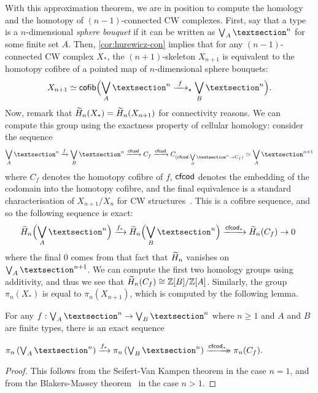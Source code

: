 \documentclass[a4page]{article}
\begin{document}
With this approximation theorem, we are in position to compute the homology and the homotopy
of \( (n - 1) \)-connected CW complexes.
%
First, say that a type is a \( n \)-dimensional \emph{sphere bouquet} if it can be
written as \( \bouquetGen{A}{n} \) for some finite set \( A \).
%
Then, \cref{cor:hurewicz-con} implies that for any \( (n - 1) \)-connected CW complex \( X_\ast \), the
\( (n+1) \)-skeleton \( X_{n+1} \) is equivalent to the homotopy cofibre of a pointed map of
\( n \)-dimensional sphere bouquets:
%
\[
X_{n+1} \simeq \mathsf{cofib}\Big( \bouquetGen{A}{n} \xrightarrow{\ f\ }_\star \bouquetGen{B}{n} \Big).
\]
%
Now, remark that \( \textnormal{\ensuremath{\widetilde{H}_{n}}}(X_\ast) = \textnormal{\ensuremath{\widetilde{H}_{n}}}(X_{n+1})\) for connectivity reasons.
%
We can compute this group using the exactness property of cellular homology:
consider the sequence
%
\[
\bouquetGenL{A}{n} \xrightarrow{f} \bouquetGenL{B}{n} \xrightarrow{\cfcod} C_f
\xrightarrow{\cfcod} C_{(\cfcod : \bouquetGenL{B}{n} \to C_f)} \simeq \bouquetGenL{A}{n+1}
\]
%
where \( C_f \) denotes the homotopy cofibre of \( f \), \( \textnormal{\ensuremath{\textsf{cfcod}}} \) denotes the embedding
of the codomain into the homotopy cofibre, and the final equivalence is a standard characterisation
of $X_{n+1}/X_{n}$ for CW structures~\cite{BuchholtzFavonia18}.
%
This is a cofibre sequence, and so the following sequence is exact:
%
\[
\!\!\hredstr{n}\Big(\bouquetGen{A}{n}\Big) \xrightarrow{f_*} \hredstr{n}\Big(\bouquetGen{B}{n}\Big) \xrightarrow{\cfcod_*} \hredstr{n}{(C_f)} \to 0
\]
%
where the final $0$ comes from that fact that $\textnormal{\ensuremath{\widetilde{H}_{n}}}$ vanishes on $\bouquetGen{A}{n+1}$.
We can compute the first two homology groups using additivity, and thus we see that
$\textnormal{\ensuremath{\widetilde{H}_{n}}}(C_f) \cong \mathbb{Z}[B]/\mathbb{Z}[A]$.
%
Similarly, the group $\pi_n(X_\ast)$ is equal to \( \pi_n(X_{n+1}) \), which is computed
by the following lemma.

\begin{proposition}\label{prop:hurewicz-seq}
  For any $f : \bouquetGen{A}{n} \to \bouquetGen{B}{n}$ where $n\geq 1$ and $A$ and $B$ are finite
  types, there is an exact sequence
  \begin{center}
    \( \pi_n\left(\bouquetGen{A}{n}\right) \xrightarrow{f_*} \pi_n\left(\bouquetGen{B}{n}\right)
       \dhxrightarrow{\cfcod_*} \pi_n(C_f). \)
  \end{center}
\end{proposition}

\begin{proof}
  This follows from the Seifert-Van Kampen theorem \cite[Example 8.7.17]{HoTT13} in the case
  \( n = 1 \), and from the Blakers-Massey theorem~\cite{FavoniaFinster+16} in the case \( n > 1 \).
\end{proof}
\end{document}
